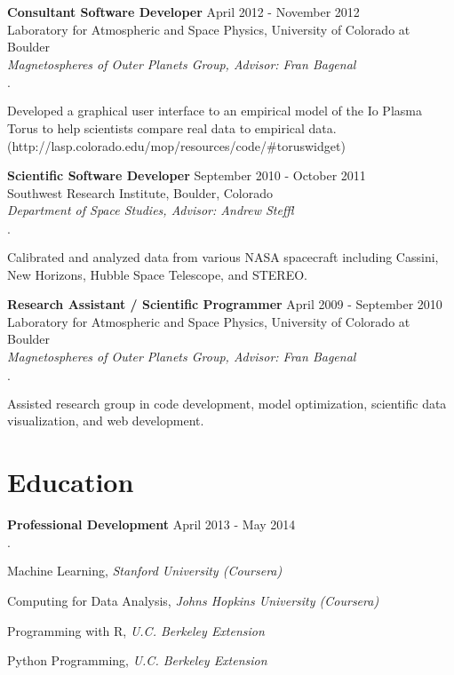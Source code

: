 \documentclass[margin,line]{res}
\newenvironment{list2}{
  \begin{list}{$\cdot$}{%
      \setlength{\itemsep}{0in}
      \setlength{\parsep}{0in} \setlength{\parskip}{0in}
      \setlength{\topsep}{0in} \setlength{\partopsep}{0in} 
      \setlength{\leftmargin}{0.2in}}}{\end{list}}
\begin{document}
\begin{resume}
{\bf Consultant Software Developer} \hfill {April 2012 - November 2012}\\
Laboratory for Atmospheric and Space Physics, University of Colorado at Boulder\\
{\em Magnetospheres of Outer Planets Group, Advisor: Fran Bagenal}
\begin{list2}
\item Developed a graphical user interface to an empirical model of the Io Plasma Torus to help scientists compare real data to empirical data. (http://lasp.colorado.edu/mop/resources/code/\#toruswidget)
\end{list2}

{\bf Scientific Software Developer} \hfill {September 2010 - October 2011}\\
Southwest Research Institute, Boulder, Colorado\\
{\em Department of Space Studies, Advisor: Andrew Steffl}
\begin{list2}
\item Calibrated and analyzed data from various NASA spacecraft including Cassini, New Horizons, Hubble Space Telescope, and STEREO.
\end{list2}

{\bf Research Assistant / Scientific Programmer} \hfill {April 2009 - September 2010}\\
Laboratory for Atmospheric and Space Physics, University of Colorado at Boulder\\
{\em Magnetospheres of Outer Planets Group, Advisor: Fran Bagenal}
\begin{list2}
\item Assisted research group in code development, model optimization, scientific data visualization, and web development.
\end{list2}


\section{\sc Education}

{\bf Professional Development} \hfill {April 2013 - May 2014}\\
\vspace*{-.15in}
\begin{list2}
\item Machine Learning, {\em Stanford University (Coursera)}
\item Computing for Data Analysis, {\em Johns Hopkins University (Coursera)}
\item Programming with R, {\em U.C. Berkeley Extension}
\item Python Programming, {\em U.C. Berkeley Extension}
\end{list2}


\end{resume}
\end{document}
